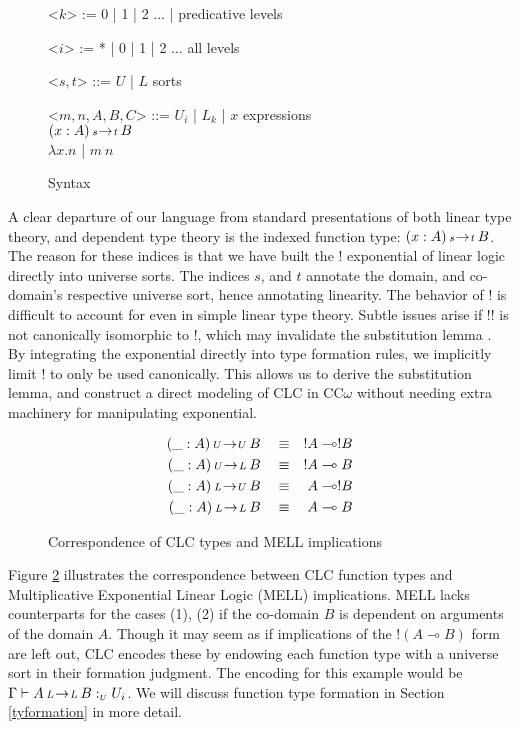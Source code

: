 \documentclass{article}
\theoremstyle{definition}
\newcommand{\indalt}[1][2]{\\\hspace*{-1.2em}\textbar\quad}
\newcommand{\utype}{:_{\scriptscriptstyle U}}
\newcommand{\arw}[2]
{\hspace*{0.2em}{\scriptstyle #1}\hspace*{-0.2em}
\rightarrow
\hspace*{-0.2em}{\scriptstyle #2}\hspace*{0.2em}}
\begin{document}
  \begin{figure}[H]
    \caption{Syntax}
    \centering
    \begin{minipage}{0.8\linewidth}
    \begin{grammar}
      <$k$> := 0 | 1 | 2 ... | \phantom{*} \hspace*{5.8em} predicative levels

      <$i$> := * | 0 | 1 | 2 ... \hspace*{5.8em} all levels

      <$s, t$> ::= $U$ | $L$ \phantom{| $x$} \hspace*{8em} sorts

      <$m, n, A, B, C$> ::= $U_i$ | $L_k$ | $x$ \hspace*{7.3em} expressions
      \indalt $(x : A) \arw{s}{t} B$
      \indalt $\lambda x. n$ | $m\ n$
    \end{grammar}
    \end{minipage}
    \label{syntax}
  \end{figure}
  A clear departure of our language from standard presentations of both linear type theory, and dependent type theory is the indexed function type: $(x : A) \arw{s}{t} B$. The reason for these indices is that we have built the ! exponential of linear logic directly into universe sorts. The indices $s$, and $t$ annotate the domain, and co-domain's respective universe sort, hence annotating linearity. The behavior of ! is difficult to account for even in simple linear type theory. Subtle issues arise if !! is not canonically isomorphic to !, which may invalidate the substitution lemma \cite{substitute}. By integrating the exponential directly into type formation rules, we implicitly limit ! to only be used canonically. This allows us to derive the substitution lemma, and construct a direct modeling of CLC in CC$\omega$ without needing extra machinery for manipulating exponential.
  \begin{figure}[H]
    \caption{Correspondence of CLC types and MELL implications}
    \begin{align}
      (\_ : A) \arw{U}{U} B \quad &\equiv \quad !A \multimap !B \\
      (\_ : A) \arw{U}{L} B \quad &\equiv \quad !A \multimap B \\
      (\_ : A) \arw{L}{U} B \quad &\equiv \quad A \multimap !B \\
      (\_ : A) \arw{L}{L} B \quad &\equiv \quad A \multimap B
    \end{align}
    \label{correspondence}
  \end{figure}
  Figure \ref{correspondence} illustrates the correspondence between CLC function types and Multiplicative Exponential Linear Logic (MELL) implications. MELL lacks counterparts for the cases (1), (2) if the co-domain $B$ is dependent on arguments of the domain $A$. Though it may seem as if implications of the $!(A \multimap B)$ form are left out, CLC encodes these by endowing each function type with a universe sort in their formation judgment. The encoding for this example would be $\Gamma \vdash A \arw{L}{L} B \utype U_i $. We will discuss function type formation in Section \ref{tyformation} in more detail.
\end{document}
